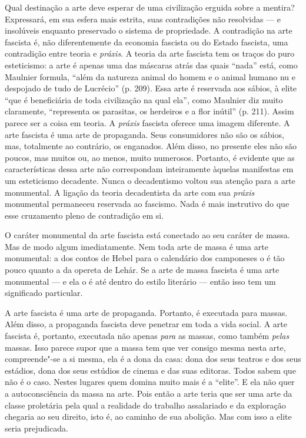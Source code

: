 Qual destinação a arte deve esperar de uma civilização erguida sobre a
mentira? Expressará, em sua esfera mais estrita, suas contradições não
resolvidas --- e insolúveis enquanto preservado o sistema de propriedade.
A contradição na arte fascista é, não diferentemente da economia
fascista ou do Estado fascista, uma contradição entre teoria e
\emph{práxis}. A teoria da arte fascista tem os traços do puro
esteticismo: a arte é apenas uma das máscaras atrás das quais ``nada''
está, como Maulnier formula, ``além da natureza animal do homem e o
animal humano nu e despojado de tudo de Lucrécio'' (p. 209). Essa arte é
reservada aos sábios, à elite ``que é beneficiária de toda civilização
na qual ela'', como Maulnier diz muito claramente, ``representa os
parasitas, os herdeiros e a flor inútil'' (p. 211). Assim parece ser a
coisa em teoria. A \emph{práxis} fascista oferece uma imagem diferente.
A arte fascista é uma arte de propaganda. Seus consumidores não são os
sábios, mas, totalmente ao contrário, os enganados. Além disso, no
presente eles não são poucos, mas muitos ou, ao menos, muito numerosos.
Portanto, é evidente que as características dessa arte não correspondam
inteiramente àquelas manifestas em um esteticismo decadente. Nunca o
decadentismo voltou sua atenção para a arte monumental. A ligação da
teoria decadentista da arte com sua \emph{práxis} monumental permaneceu
reservada ao fascismo. Nada é mais instrutivo do que esse cruzamento
pleno de contradição em si.

O caráter monumental da arte fascista está conectado ao seu caráter de
massa. Mas de modo algum imediatamente. Nem toda arte de massa é uma
arte monumental: a dos contos de Hebel para o calendário dos camponeses
o é tão pouco quanto a da opereta de Lehár. Se a arte de massa fascista
é uma arte monumental --- e ela o é até dentro do estilo literário ---
então isso tem um significado particular.

A arte fascista é uma arte de propaganda. Portanto, é executada para
massas. Além disso, a propaganda fascista deve penetrar em toda a vida
social. A arte fascista é, portanto, executada não apenas \emph{para} as
massas, como também \emph{pelas} massas. Isso parece supor que a massa
tem que ver consigo mesma nesta arte, compreende"-se a si mesma, ela é a
dona da casa: dona dos seus teatros e dos seus estádios, dona dos seus
estúdios de cinema e das suas editoras. Todos sabem que não é o caso.
Nestes lugares quem domina muito mais é a ``elite''. E ela não quer a
autoconsciência da massa na arte. Pois então a arte teria que ser uma
arte da classe proletária pela qual a realidade do trabalho assalariado
e da exploração chegaria ao seu direito, isto é, ao caminho de sua
abolição. Mas com isso a elite seria prejudicada.

